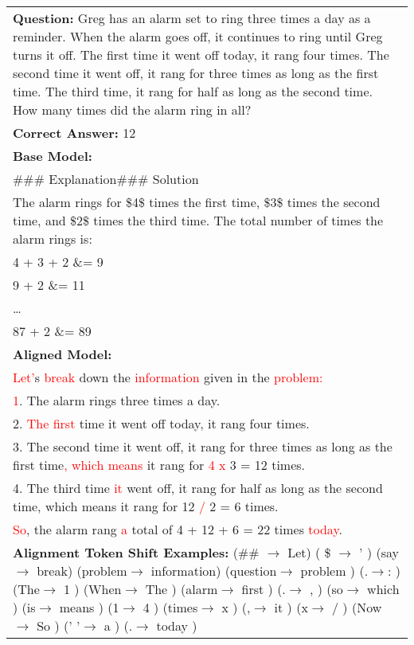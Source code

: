 \begin{table*}[htp]

\begin{center}

\begin{tabular}{|p{14cm}|}
\toprule
\textbf{Question:} Greg has an alarm set to ring three times a day as a reminder. When the alarm goes off, it continues to ring until Greg turns it off. The first time it went off today, it rang four times. The second time it went off, it rang for three times as long as the first time. The third time, it rang for half as long as the second time. How many times did the alarm ring in all? \\
\textbf{Correct Answer:} 12 \\
\midrule
\textbf{Base Model:} \\
\#\#\# Explanation\#\#\# Solution \\
The alarm rings for \$4\$ times the first time, \$3\$ times the second time, and \$2\$ times the third time. The total number of times the alarm rings is: \\
4 + 3 + 2 \&= 9 \\
9 + 2 \&= 11\\
… \\
87 + 2 \&= 89 \\
\midrule
\textbf{Aligned Model:} \\
\textcolor{red}{Let'}s \textcolor{red}{break} down the \textcolor{red}{information} given in the \textcolor{red}{problem:}\\
\textcolor{red}{1}. The alarm rings three times a day.\\
2. \textcolor{red}{The first} time it went off today, it rang four times.\\
3. The second time it went off, it rang for three times as long as the first time\textcolor{red}{, which means} it rang for \textcolor{red}{4 x} 3 = 12 times.\\
4. The third time \textcolor{red}{it} went off, it rang for half as long as the second time, which means it rang for 12 \textcolor{red}{/} 2 = 6 times.\\
\textcolor{red}{So}, the alarm rang \textcolor{red}{a} total of 4 + 12 + 6 = 22 times \textcolor{red}{today}.\\
\midrule
\textbf{Alignment Token Shift Examples:} (\#\# $\rightarrow$ Let)  ( \$ $\rightarrow$ ' )  (say$\rightarrow$ break) (problem$\rightarrow$ information)  (question$\rightarrow$ problem ) (.$\rightarrow$: ) (The$\rightarrow$ 1 ) (When$\rightarrow$ The ) (alarm$\rightarrow$ first ) (.$\rightarrow$ , ) (so$\rightarrow$ which ) (is$\rightarrow$ means ) (1$\rightarrow$ 4 ) (times$\rightarrow$ x ) (,$\rightarrow$ it ) (x$\rightarrow$ / ) (Now$\rightarrow$ So ) (' '$\rightarrow$ a ) (.$\rightarrow$ today ) \\

\end{tabular}
\end{center}
\end{table*}

